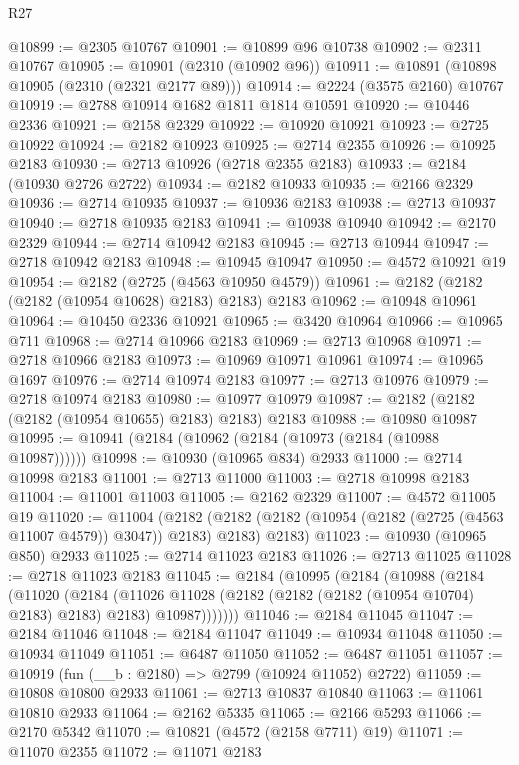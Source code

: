 \begin{lexlean}{R27}
\begin{coremodule}
@10899 := @2305 @10767
@10901 := @10899 @96 @10738
@10902 := @2311 @10767
@10905 := @10901 (@2310 (@10902 @96))
@10911 := @10891 (@10898 @10905 (@2310 (@2321 @2177 @89)))
@10914 := @2224 (@3575 @2160) @10767
@10919 := @2788 @10914 @1682 @1811 @1814 @10591
@10920 := @10446 @2336
@10921 := @2158 @2329
@10922 := @10920 @10921
@10923 := @2725 @10922
@10924 := @2182 @10923
@10925 := @2714 @2355
@10926 := @10925 @2183
@10930 := @2713 @10926 (@2718 @2355 @2183)
@10933 := @2184 (@10930 @2726 @2722)
@10934 := @2182 @10933
@10935 := @2166 @2329
@10936 := @2714 @10935
@10937 := @10936 @2183
@10938 := @2713 @10937
@10940 := @2718 @10935 @2183
@10941 := @10938 @10940
@10942 := @2170 @2329
@10944 := @2714 @10942 @2183
@10945 := @2713 @10944
@10947 := @2718 @10942 @2183
@10948 := @10945 @10947
@10950 := @4572 @10921 @19
@10954 := @2182 (@2725 (@4563 @10950 @4579))
@10961 := @2182 (@2182 (@2182 (@10954 @10628) @2183) @2183) @2183
@10962 := @10948 @10961
@10964 := @10450 @2336 @10921
@10965 := @3420 @10964
@10966 := @10965 @711
@10968 := @2714 @10966 @2183
@10969 := @2713 @10968
@10971 := @2718 @10966 @2183
@10973 := @10969 @10971 @10961
@10974 := @10965 @1697
@10976 := @2714 @10974 @2183
@10977 := @2713 @10976
@10979 := @2718 @10974 @2183
@10980 := @10977 @10979
@10987 := @2182 (@2182 (@2182 (@10954 @10655) @2183) @2183) @2183
@10988 := @10980 @10987
@10995 := @10941 (@2184 (@10962 (@2184 (@10973 (@2184 (@10988 @10987))))))
@10998 := @10930 (@10965 @834) @2933
@11000 := @2714 @10998 @2183
@11001 := @2713 @11000
@11003 := @2718 @10998 @2183
@11004 := @11001 @11003
@11005 := @2162 @2329
@11007 := @4572 @11005 @19
@11020 := @11004
    (@2182 (@2182 (@2182 (@10954 (@2182 (@2725 (@4563 @11007 @4579)) @3047)) @2183) @2183) @2183)
@11023 := @10930 (@10965 @850) @2933
@11025 := @2714 @11023 @2183
@11026 := @2713 @11025
@11028 := @2718 @11023 @2183
@11045 := @2184
    (@10995
      (@2184
        (@10988
          (@2184
            (@11020
              (@2184
                (@11026
                  @11028
                  (@2182 (@2182 (@2182 (@10954 @10704) @2183) @2183) @2183)
                  @10987)))))))
@11046 := @2184 @11045
@11047 := @2184 @11046
@11048 := @2184 @11047
@11049 := @10934 @11048
@11050 := @10934 @11049
@11051 := @6487 @11050
@11052 := @6487 @11051
@11057 := @10919 (fun (__b : @2180) => @2799 (@10924 @11052) @2722)
@11059 := @10808 @10800 @2933
@11061 := @2713 @10837 @10840
@11063 := @11061 @10810 @2933
@11064 := @2162 @5335
@11065 := @2166 @5293
@11066 := @2170 @5342
@11070 := @10821 (@4572 (@2158 @7711) @19)
@11071 := @11070 @2355
@11072 := @11071 @2183

\end{coremodule}
\end{lexlean}
